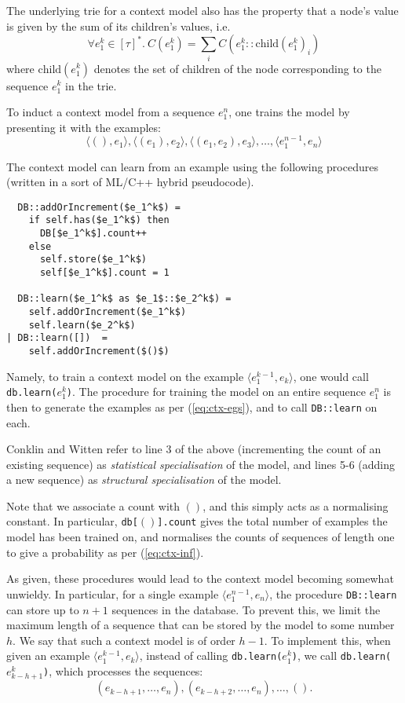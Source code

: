 \documentclass[12pt,a4paper,twoside]{article}
\newcommand{\pair}[1]{\langle #1 \rangle}
\begin{document}
The underlying trie for a context model also has the property that a node's
value is given by the sum of its children's values, i.e.
$$
  \forall e_1^k \in [\tau]^* .\ C(e_1^k) = \sum_{i}
  C(e_1^k :: \mathrm{child}(e_1^k)_i) \label{eq:trie-sum} 
$$
where $\mathrm{child}(e_1^k)$ denotes the set of children of the node
corresponding to the sequence $e_1^k$ in the trie.

To induct a context model from a sequence $e_1^n$, one trains the model by
presenting it with the examples:
\begin{equation}
  \pair{(), e_1}, \pair{(e_1), e_2}, \pair{(e_1, e_2), e_3}, \ldots,
  \pair{e_1^{n-1}, e_n} \label{eq:ctx-egs}
\end{equation} 

The context model can learn from an example using the following procedures
(written in a sort of ML/C++ hybrid pseudocode).

\begin{lstlisting}
  DB::addOrIncrement($e_1^k$) =
    if self.has($e_1^k$) then
      DB[$e_1^k$].count++     
    else 
      self.store($e_1^k$)     
      self[$e_1^k$].count = 1 

  DB::learn($e_1^k$ as $e_1$::$e_2^k$) =
    self.addOrIncrement($e_1^k$)
    self.learn($e_2^k$)
| DB::learn([])  =
    self.addOrIncrement($()$)
\end{lstlisting}

Namely, to train a context model on the example $\pair{e_1^{k-1}, e_k}$,
one would call \texttt{db.learn($e_1^k$)}. The procedure for training the
model on an entire sequence $e_1^n$ is then to generate the examples as per
(\ref{eq:ctx-egs}), and to call \texttt{DB::learn} on each.

Conklin and Witten refer to line 3 of the above (incrementing the count of an
existing sequence) as \emph{statistical specialisation} of the model, and lines
5-6 (adding a new sequence) as \emph{structural specialisation} of the model.

Note that we associate a count with $()$, and this simply acts as a normalising
constant. In particular, \texttt{db[$()$].count} gives the total number of
examples the model has been trained on, and normalises the counts of sequences
of length one to give a probability as per (\ref{eq:ctx-inf}).

As given, these procedures would lead to the context model becoming somewhat
unwieldy. In particular, for a single example $\pair{e_1^{n-1}, e_n}$, the
procedure \texttt{DB::learn} can store up to $n+1$ sequences in the
database. To prevent this, we limit the maximum length of a sequence that can be
stored by the model to some number $h$. We say that such a context model is of
order $h-1$. To implement this, when given an example $\pair{e_1^{k-1}, e_k}$,
instead of calling \texttt{db.learn($e_1^k$)}, we call
\texttt{db.learn($e_{k-h+1}^k$)}, which processes the sequences:
$$ (e_{k-h+1}, \ldots, e_n), (e_{k-h+2}, \ldots, e_n), \ldots, (). $$
\end{document}
